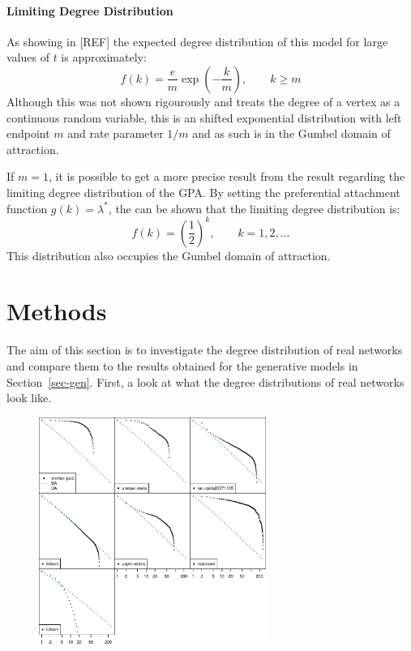 \documentclass[
  10pt,
  a4paper,
]{scrreprt}
\theoremstyle{plain}
\theoremstyle{definition}
\theoremstyle{remark}
\begin{document}
{\hypertarget{limiting-degree-distribution-1}{%
\subsubsection{Limiting Degree
Distribution}\label{limiting-degree-distribution-1}}

As showing in {[}REF{]} the expected degree distribution of this model
for large values of \(t\) is approximately: \[
f(k) = \displaystyle\frac{e}{m}\exp\left(-\displaystyle\frac{k}{m}\right),\qquad k \ge m
\] Although this was not shown rigourously and treats the degree of a
vertex as a continuous random variable, this is an shifted exponential
distribution with left endpoint \(m\) and rate parameter \(1/m\) and as
such is in the Gumbel domain of attraction.

If \(m=1\), it is possible to get a more precise result from the result
regarding the limiting degree distribution of the GPA. By setting the
preferential attachment function \(g(k) = \lambda^*\), the can be shown
that the limiting degree distribution is: \[
f(k) = \left(\frac{1}{2} \right)^{k}, \qquad k=1,2,\ldots 
\] This distribution also occupies the Gumbel domain of attraction.

\hypertarget{sec-meth}{%
\chapter{Methods}\label{sec-meth}}

The aim of this section is to investigate the degree distribution of
real networks and compare them to the results obtained for the
generative models in Section~\ref{sec-gen}. First, a look at what the
degree distributions of real networks look like.

\begin{figure}[H]

{\centering \includegraphics[width=0.66\textwidth,height=\textheight]{doc_files/figure-pdf/fig-survs-1.pdf}

}
\end{figure}}
\end{document}
